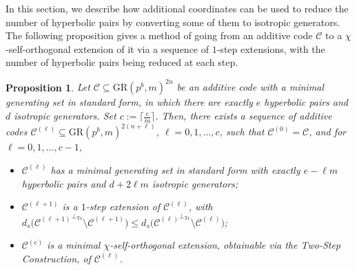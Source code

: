 \documentclass{article}
\DeclareMathOperator{\Tr}{Tr}
\newtheorem{prop}{Proposition}[section]
\theoremstyle{remark}
\theoremstyle{definition}
\numberwithin{equation}{section}
\begin{document}
In this section, we describe how additional coordinates can be used to reduce the number of hyperbolic pairs by converting some of them to isotropic generators.  The following proposition gives a method of going from an additive code $\mathcal{C}$ to a $\chi$-self-orthogonal extension of it via a sequence of $1$-step extensions, with the number of hyperbolic pairs being reduced at each step.

\begin{prop} \label{prop:extless}
 Let $\mathcal{C} \subseteq \text{GR}(p^b,m)^{2n}$ be an additive code with a minimal generating set in standard form, in which there are exactly $e$ hyperbolic pairs and $d$ isotropic generators. Set $c := \lceil \frac{e}{m}\rceil$. Then, there exists a sequence of additive codes $\mathcal{C}^{(\ell)} \subseteq \text{GR}(p^b,m)^{2(n+\ell)}$, $\ell = 0,1,\ldots,c$, such that $\mathcal{C}^{(0)} = \mathcal{C}$, and for $\ell=0,1,\ldots,c-1$,
 \begin{itemize}
  \item[(i)] $\mathcal{C}^{(\ell)}$ has a minimal generating set in standard form with exactly $e - \ell m$ hyperbolic pairs and $d+2\ell m$ isotropic generators;
  \item[(ii)] $\mathcal{C}^{(\ell+1)}$ is a $1$-step extension of $\mathcal{C}^{(\ell)}$, with $d_s\bigl({\mathcal{C}^{(\ell+1)}}^{\perp_{\Tr}} \setminus \mathcal{C}^{(\ell+1)}\bigr) \le d_s\bigl({\mathcal{C}^{(\ell)}}^{\perp_{\Tr}} \setminus \mathcal{C}^{(\ell)}\bigr)$;
  \item[(iii)] $\mathcal{C}^{(c)}$ is a minimal $\chi$-self-orthogonal extension, obtainable via the Two-Step Construction, of $\mathcal{C}^{(\ell)}$.
  \end{itemize}
 \end{prop}
\end{document}
